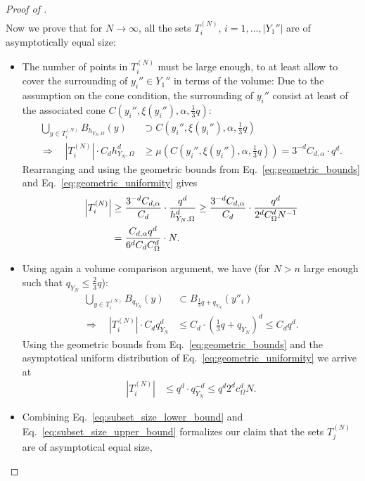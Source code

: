 \documentclass[a4paper, 10pt]{article}
\begin{document}
\begin{proof}[Proof of ]
\begin{align*}
\end{align*}
Now we prove that for $N \rightarrow \infty$, all the sets $T_i^{(N)}$, $i=1, ..., |Y_1''|$ are of asymptotically equal size:
\begin{itemize}
\item The number of points in $T_i^{(N)}$ must be large enough, to at least allow to cover the surrounding of $y_i'' \in Y_1''$ in terms of the volume:
Due to the assumption on the cone condition, 
the surrounding of $y_i''$ consist at least of the associated cone $C(y_i'', \xi(y_i''), \alpha, \frac{1}{3} q)$:
%
\begin{align*}
\bigcup_{y \in T_i^{(N)}} B_{h_{Y_N, \Omega}}(y) &\supset C(y_i'', \xi(y_i''), \alpha, \frac{1}{3}q) \\
\Rightarrow \quad \left|T_i^{(N)} \right| \cdot C_d h_{Y_N, \Omega}^{d} &\geq \mu(C(y_i'', \xi(y_i''), \alpha, \frac{1}{3}q)) = 3^{-d} C_{d, \alpha} \cdot q^d.
\end{align*}
Rearranging and using the geometric bounds from Eq.\ \eqref{eq:geometric_bounds} and Eq.\ \eqref{eq:geometric_uniformity} gives
\begin{align}
\label{eq:subset_size_lower_bound}
\left| T_i^{(N)} \right| &\geq \frac{3^{-d} C_{d, \alpha}}{C_d} \cdot \frac{q^d}{h_{Y_N, \Omega}^d}
\geq \frac{3^{-d} C_{d, \alpha}}{C_d} \cdot \frac{q^d}{2^d C_\Omega^d N^{-1}} \notag \\
&= \frac{C_{d, \alpha} q^d}{6^d C_d C_\Omega^d} \cdot N.
\end{align}
\item Using again a volume comparison argument, we have (for $N > n$ large enough such that $q_{Y_N} \leq \frac{2}{3} q$):
\begin{align*}
%
\bigcup_{y \in T_i^{(N)}} B_{q_{Y_N}}(y) &\subset B_{\frac{1}{3}q + q_{Y_N}}(y''_i) \\
\Rightarrow \quad \left| T_i^{(N)} \right| \cdot C_d q_{Y_N}^d &\leq C_d \cdot \left( \frac{1}{3}q + q_{Y_N} \right)^d \leq C_d q^d.
\end{align*}
Using the geometric bounds from Eq.\ \eqref{eq:geometric_bounds} and the asymptotical uniform distribution of Eq.\ \eqref{eq:geometric_uniformity} we arrive at
\begin{align}
\label{eq:subset_size_upper_bound}
\left| T_i^{(N)} \right| &\leq q^d \cdot q_{Y_N}^{-d} \leq q^d 2^d c_\Omega^d N.
\end{align}
\item Combining Eq.\ \eqref{eq:subset_size_lower_bound} and Eq.\ \eqref{eq:subset_size_upper_bound} formalizes our claim that the sets $T_j^{(N)}$ are of asymptotical equal size, 

\end{itemize}
\end{proof}
\end{document}

